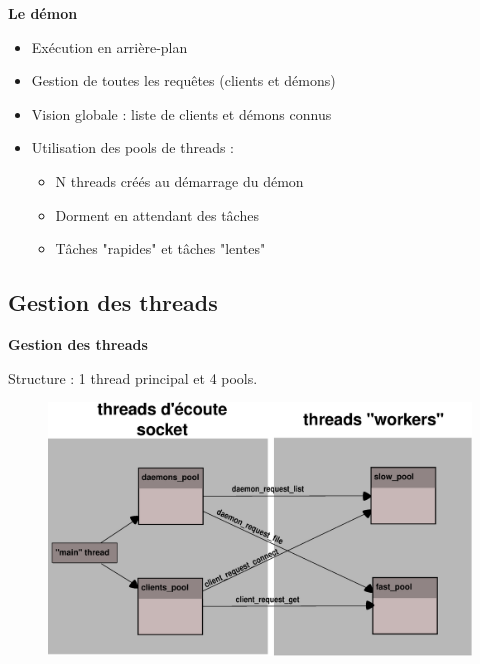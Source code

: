 \documentclass{beamer}
\begin{document}
\begin{frame}
    \textbf{Le démon}
    
    \begin{itemize}
        \item Exécution en arrière-plan
        \item Gestion de toutes les requêtes (clients et démons)
        \item Vision globale : liste de clients et démons connus
        \item Utilisation des pools de threads :
            \begin{itemize}
                \item N threads créés au démarrage du démon
                \item Dorment en attendant des tâches
                \item Tâches "rapides" et tâches "lentes"
            \end{itemize}
     \end{itemize}
\end{frame}

\begin{frame}
    \section{Gestion des threads}

    \textbf{Gestion des threads}

    Structure : 1 thread principal et 4 pools.
\begin{center}
\begin{figure}[htbp]
    \centering
    \includegraphics[scale=0.4]{pools_interacting.eps}
\end{figure}
\end{center}

\end{frame}
\end{document}

